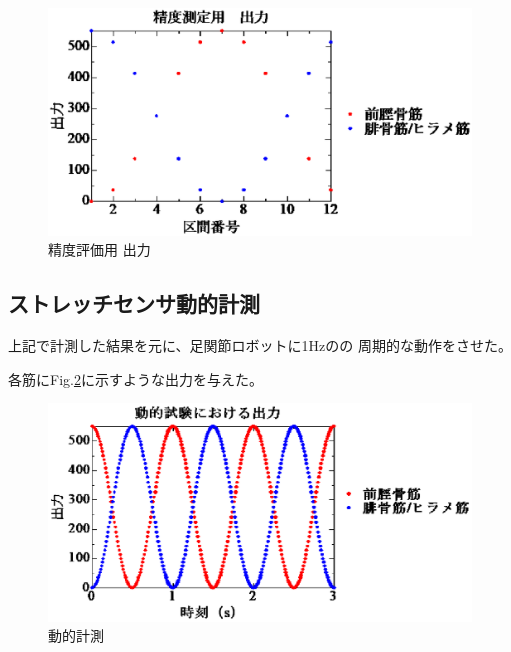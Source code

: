 \begin{figure}[h]
    \begin{center}
        \includegraphics[width=0.76\columnwidth,clip]{2_measurement/output/output.eps}
        \caption{精度評価用 出力}
        \label{output_for_test}
    \end{center}
\end{figure}

\subsection{ストレッチセンサ動的計測}
上記で計測した結果を元に、足関節ロボットに1Hzのの
周期的な動作をさせた。

各筋にFig.\ref{output_for_actions}に示すような出力を与えた。

\begin{figure}[h]
  \includegraphics[width=0.76\columnwidth,clip]{3_analysis/outPut/putPut.eps}
  \caption{動的計測}
  \label{output_for_actions}
\end{figure}
